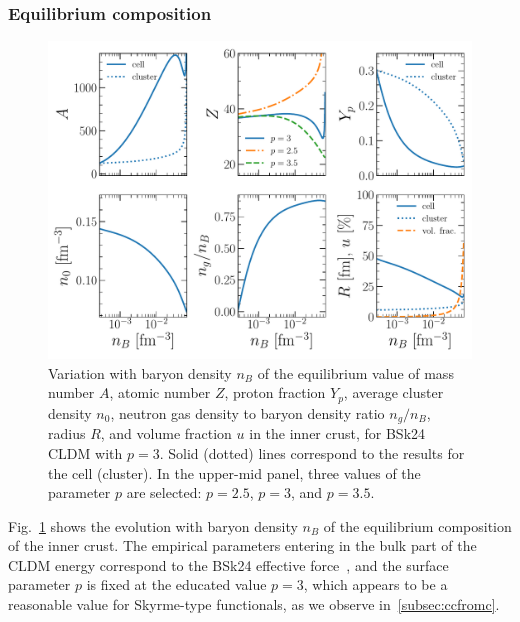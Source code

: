 \subsubsection{Equilibrium composition}

\begin{figure}[!t]
\begin{center}
  \includegraphics[width=0.9\linewidth]{figures/compo_icrust_bsk24.pdf}
\end{center}
\caption[Ground-state composition versus baryon density in the inner crust]{Variation 
  with baryon density $n_B$ of the equilibrium value of mass 
  number $A$, atomic number $Z$, proton fraction $Y_p$, average cluster density
$n_0$, neutron gas density to baryon density ratio $n_g/n_B$, radius $R$, and
volume fraction $u$ in
the inner crust, for BSk24 CLDM with $p=3$. Solid (dotted) lines correspond to 
the results for the cell (cluster). In the upper-mid panel, three values of the
parameter $p$ are selected: $p=2.5$, $p=3$, and $p=3.5$.}\label{fig:compo_icrust_bsk24}
\end{figure}
%
Fig.~\ref{fig:compo_icrust_bsk24} shows the evolution with baryon density $n_B$ 
of the equilibrium composition of the inner crust. The empirical parameters 
entering in the bulk part of the CLDM energy correspond to the BSk24 effective 
force~\cite{Goriely2013}, and the surface parameter $p$ is fixed at the
educated value $p=3$, which appears to be a reasonable value for Skyrme-type 
functionals, as we observe in~\ref{subsec:ccfromc}.
 
